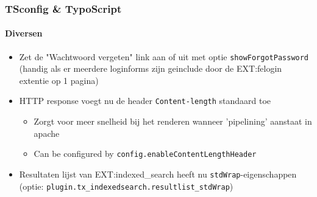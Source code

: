 %
%

\begin{frame}[fragile]
	\frametitle{TSconfig \& TypoScript}
	\framesubtitle{Diversen}

	\begin{itemize}

		\item Zet de "Wachtwoord vergeten" link aan of uit met optie \small\texttt{showForgotPassword}\normalsize\newline
			(handig als er meerdere loginforms zijn geinclude door de EXT:felogin extentie op 1 pagina)

		\item HTTP response voegt nu de header \texttt{Content-length} standaard toe

			\begin{itemize}
				\item Zorgt voor meer snelheid bij het renderen wanneer 'pipelining' aanstaat in apache				\item Can be configured by \texttt{config.enableContentLengthHeader}
			\end{itemize}

		\item Resultaten lijst van EXT:indexed\_search heeft nu \texttt{stdWrap}-eigenschappen\newline
			(optie: \texttt{plugin.tx\_indexedsearch.resultlist\_stdWrap})

	\end{itemize}

\end{frame}


